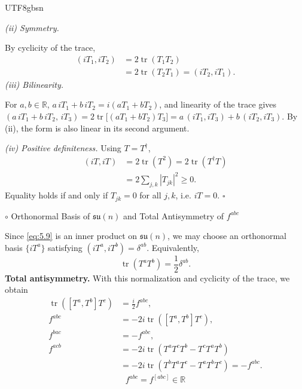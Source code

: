 \documentclass[11pt,a4paper,oneside]{report}
\makeatletter
\newcommand\divtitle[1]{\par\addvspace{1.1ex}\noindent
  {\normalfont\normalsize #1}\par\nobreak\vspace{.35ex}\@afterindentfalse\@afterheading}
\newenvironment{qftinset}{\begin{list}{}{\setlength{\leftmargin}{2em}\setlength{\rightmargin}{0pt}\setlength{\listparindent}{\parindent}}\item[]}{\end{list}}
\makeatother
\begin{document}
\begin{CJK*}{UTF8}{gbsn}
\begin{qftinset}
\emph{(ii) Symmetry.}

By cyclicity of the trace,
\begin{equation*}
\begin{aligned}
(iT_1,iT_2)&=2\operatorname{tr}(T_1T_2)\\
&=2\operatorname{tr}(T_2T_1)=(iT_2,iT_1).
\end{aligned}
\tag{5.11}\label{eq:5.11}
\end{equation*}
\emph{(iii) Bilinearity.}

For $a,b\in\mathbb R$, $a\,iT_1+b\,iT_2=i(aT_1+bT_2)$,
and linearity of the trace gives $(a\,iT_1+b\,iT_2,\,iT_3)=2\operatorname{tr}\bigl[(aT_1+bT_2)T_3\bigr]=a\,(iT_1,iT_3)+b\,(iT_2,iT_3)$. By (ii), the form is also linear in its second argument.

\emph{(iv) Positive definiteness.} Using $T=T^\dagger$,
\begin{equation*}
\begin{aligned}
(iT,iT)&=2\operatorname{tr}(T^2)=2\operatorname{tr}(T^\dagger T)\\
&=2\sum_{j,k}|T_{jk}|^2\ge0.
\end{aligned}
\tag{5.12}\label{eq:5.12}
\end{equation*}
Equality holds if and only if $T_{jk}=0$ for all $j,k$, i.e. $iT=0$. $\square$

\end{qftinset}

\label{ym-orthonormal}%
\begin{qftinset}

\divtitle{$\circ$ Orthonormal Basis of $\mathfrak{su}(n)$ and Total Antisymmetry of $f^{abc}$}

Since \eqref{eq:5.9} is an inner product on $\mathfrak{su}(n)$, we may choose an orthonormal basis $\{iT^a\}$ satisfying $(iT^a,iT^b)=\delta^{ab}$. Equivalently,
\begin{equation*}
{\displaystyle \operatorname{tr}(T^aT^b)=\frac12\delta^{ab}.}
\tag{5.13}\label{eq:5.13}
\end{equation*}
\textbf{\boldmath Total antisymmetry.} With this normalization and cyclicity of the trace, we obtain
\begin{equation*}
\begin{aligned}
\operatorname{tr}([T^a,T^b]T^c)&=\frac{i}{2}f^{abc},\\
f^{abc}&=-2i\operatorname{tr}([T^a,T^b]T^c),\\
f^{bac}&=-f^{abc},\\
f^{acb}
&=-2i\operatorname{tr}(T^aT^cT^b-T^cT^aT^b)\\
&=-2i\operatorname{tr}(T^bT^aT^c-T^aT^bT^c)
=-f^{abc}.
\end{aligned}
\tag{5.14}\label{eq:5.14}
\end{equation*}
\begin{equation*}
{\displaystyle 
f^{abc}=f^{[abc]}\in\mathbb R
}
\tag{5.15}\label{eq:5.15}
\end{equation*}


\end{qftinset}
\end{CJK*}
\end{document}
